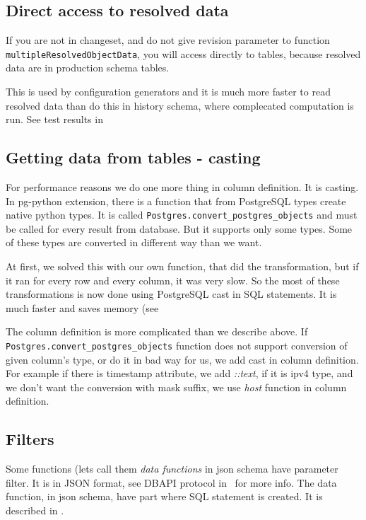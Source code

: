 \documentclass[deska]{subfiles}
\begin{document}
\subsection{Direct access to resolved data}
\label{sec:direct-access}
If you are not in changeset, and do not give revision parameter to function {\tt multipleResolvedObjectData},
you will access directly to tables, because resolved data are in production schema tables.

This is used by configuration generators and it is much more faster to read
resolved data than do this in history schema, where complecated computation is run.
See test results in 

\subsection{Getting data from tables - casting}
\label{sec:cast}
For performance reasons we do one more thing in column definition. It is casting.
In pg-python extension, there is a function that from PostgreSQL types create native python types.
It is called {\tt Postgres.convert\_\-postgres\_\-objects}
and must be called for every result from database. But it supports only some types.
Some of these types are converted in different way than we want.

At first, we solved this with our own function, that did the transformation, but if it ran for every
row and every column, it was very slow. So the most of these transformations is now done using PostgreSQL cast
in SQL statements. It is much faster and saves memory (see 

The column definition is more complicated than we describe above. If
{\tt Postgres.convert\_\-postgres\_\-objects} function 
does not support conversion of given column's type, or do it in bad way for us, we add cast in column definition.
For example if there is timestamp attribute, we add {\em ::text}, if it is ipv4 type, and we don't want
the conversion with mask suffix, we use {\em host} function in column definition.


\subsection{Filters}
\label{sec:filters}
Some functions (lets call them {\em data functions} in json schema have parameter filter. It is in JSON format,
see DBAPI protocol in~ for more info.
The data function, in json schema, have part where SQL statement is created. It is described in
.
\end{document}
